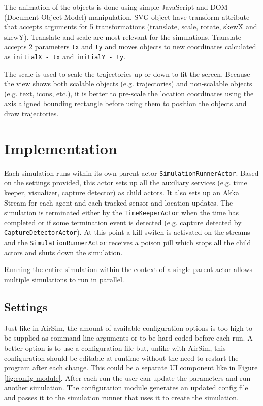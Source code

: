 \documentclass{article}
\begin{document}
The animation of the objects is done using simple JavaScript and DOM (Document Object Model) manipulation. \cite{masteringSVG} SVG object have transform attribute that accepts arguments for 5 transformations (translate, scale, rotate, skewX and skewY). Translate and scale are most relevant for the simulations. Translate accepts 2 parameters \verb|tx| and \verb|ty| and moves objects to new coordinates calculated as \verb|initialX - tx| and \verb|initialY - ty|. 

The scale is used to scale the trajectories up or down to fit the screen. Because the view shows both scalable objects (e.g. trajectories) and non-scalable objects (e.g. text, icons, etc.), it is better to pre-scale the location coordinates using the axis aligned bounding rectangle before using them to position the objects and draw trajectories.



\section{Implementation}

Each simulation runs within its own parent actor \verb|SimulationRunnerActor|. Based on the settings provided, this actor sets up all the auxiliary services (e.g. time keeper, visualizer, capture detector) as child actors. It also sets up an Akka Stream for each agent and each tracked sensor and location updates. The simulation is terminated either by the \verb|TimeKeeperActor| when the time has completed or if some termination event is detected (e.g. capture detected by \verb|CaptureDetectorActor|). At this point a kill switch is activated on the streams and the \verb|SimulationRunnerActor| receives a poison pill which stops all the child actors and shuts down the simulation.

Running the entire simulation within the context of a single parent actor allows multiple simulations to run in parallel.

\subsection{Settings}
Just like in AirSim, the amount of available configuration options is too high to be supplied as command line arguments or to be hard-coded before each run. A better option is to use a configuration file but, unlike with AirSim, this configuration should be editable at runtime without the need to restart the program after each change.
This could be a separate UI component like in Figure \ref{fig:config-module}. After each run the user can update the parameters and run another simulation. The configuration module generates an updated config file and passes it to the simulation runner that uses it to create the simulation.
\end{document}
